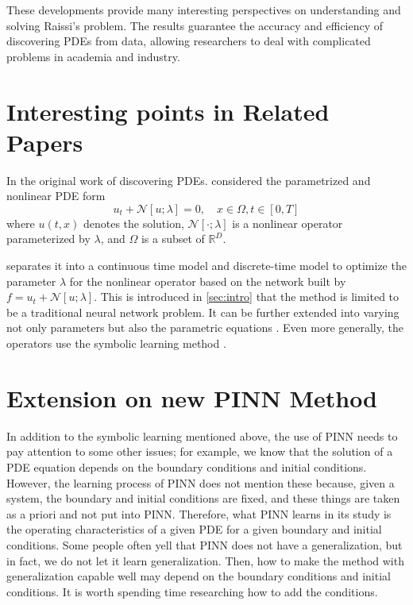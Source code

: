 \documentclass[12pt]{article}
\begin{document}
These developments provide many interesting perspectives on understanding and solving Raissi's problem. The results guarantee the accuracy and efficiency of discovering PDEs from data, allowing researchers to deal with complicated problems in academia and industry. 



\section{Interesting points in Related Papers}
\label{sec:interets}

In the original work of discovering PDEs. \citet{RAISSI2019686} considered the parametrized and nonlinear PDE form
\begin{equation}
    \label{eq:GF}
    u_t + \mathcal{N}[u;\lambda]=0, \quad x\in \Omega, t\in [0,T]
\end{equation}
where $u(t,x)$ denotes the solution, $\mathcal{N}[\cdot;\lambda]$ is a nonlinear operator parameterized by $\lambda$, and $\Omega$ is a subset of $\mathbb{R}^D$. 

\citet{RAISSI2019686} separates it into a continuous time model and discrete-time model to optimize the parameter $\lambda$ for the nonlinear operator based on the network built by $f=u_t + \mathcal{N}[u;\lambda]$. This is introduced in \ref{sec:intro} that the method is limited to be a traditional neural network problem. It can be further extended into varying not only parameters but also the parametric equations \citep{Zhang2022DeepLA}. Even more generally, the operators use the symbolic learning method \citep{PhysRevResearch.4.023174}. 





\section{Extension on new PINN Method}
\label{sec:meth}

In addition to the symbolic learning mentioned above, the use of PINN needs to pay attention to some other issues; for example, we know that the solution of a PDE equation depends on the boundary conditions and initial conditions. However, the learning process of PINN does not mention these because, given a system, the boundary and initial conditions are fixed, and these things are taken as a priori and not put into PINN. Therefore, what PINN learns in its study is the operating characteristics of a given PDE for a given boundary and initial conditions. Some people often yell that PINN does not have a generalization, but in fact, we do not let it learn generalization. Then, how to make the method with generalization capable well may depend on the boundary conditions and initial conditions. It is worth spending time researching how to add the conditions. 
\end{document}
